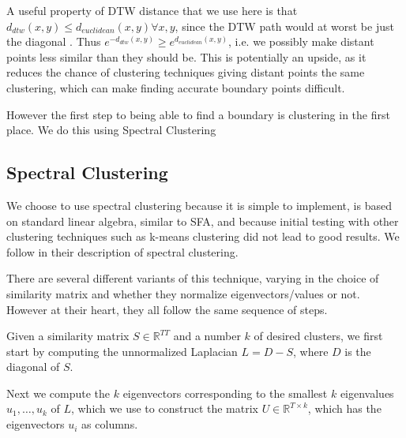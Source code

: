 A useful property of DTW distance that we use here is that $d_{dtw}(x,y)\leq d_{euclidean}(x,y) \forall x,y$, since  the DTW path would at worst be just the diagonal . Thus $e^{-d_{dtw}(x,y)}\geq e^{d_{euclidean}(x,y)}$, i.e. we possibly make distant points less similar than they should be. This is potentially an upside, as it reduces the chance of clustering techniques giving distant points the same clustering, which can make finding accurate boundary points difficult.

However the first step to being able to find a boundary is clustering in the first place. We do this using Spectral Clustering

\subsection{Spectral Clustering}
We choose to use spectral clustering because it is simple to implement, is based on standard linear algebra, similar to SFA, and because initial testing with other clustering techniques such as k-means clustering did not lead to good results.  We follow  in their description of spectral clustering.

There are several different variants of this technique, varying in the choice of similarity matrix and whether they normalize eigenvectors/values or not. However at their heart, they all follow the same sequence of steps.

Given a similarity matrix $S \in \mathbb{R}^{T  T}$ and a number $k$ of desired clusters, we first start by computing the unnormalized Laplacian $L=D-S$, where $D$ is the diagonal of $S$.

Next we compute the $k$ eigenvectors corresponding to the smallest $k$ eigenvalues  $u_1,\ldots,u_k$ of $L$, which we use to construct the matrix $U\in \mathbb{R}^{T \times k}$, which has the eigenvectors $u_i$ as columns.


